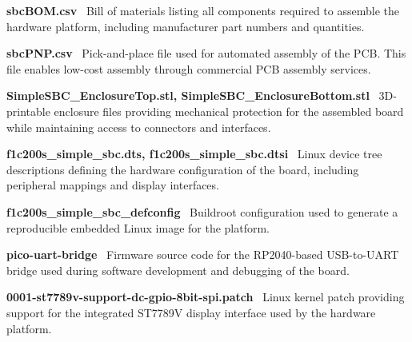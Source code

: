 \textbf{sbcBOM.csv} \
Bill of materials listing all components required to assemble the hardware platform, including manufacturer part numbers and quantities.

\textbf{sbcPNP.csv} \
Pick-and-place file used for automated assembly of the PCB. This file enables low-cost assembly through commercial PCB assembly services.

\textbf{SimpleSBC_EnclosureTop.stl, SimpleSBC_EnclosureBottom.stl} \
3D-printable enclosure files providing mechanical protection for the assembled board while maintaining access to connectors and interfaces.

\textbf{f1c200s_simple_sbc.dts, f1c200s_simple_sbc.dtsi} \
Linux device tree descriptions defining the hardware configuration of the board, including peripheral mappings and display interfaces.

\textbf{f1c200s_simple_sbc_defconfig} \
Buildroot configuration used to generate a reproducible embedded Linux image for the platform.

\textbf{pico-uart-bridge} \
Firmware source code for the RP2040-based USB-to-UART bridge used during software development and debugging of the board.

\textbf{0001-st7789v-support-dc-gpio-8bit-spi.patch} \
Linux kernel patch providing support for the integrated ST7789V display interface used by the hardware platform.
